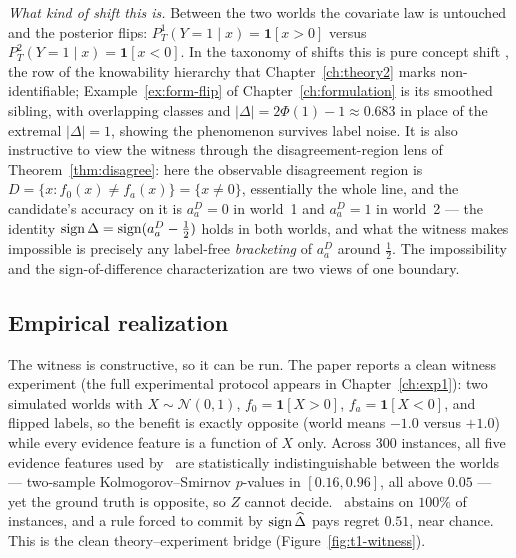 \emph{What kind of shift this is.} Between the two worlds the covariate law
is untouched and the posterior flips: $P_T^1(Y{=}1\mid x)=\mathbf1[x>0]$
versus $P_T^2(Y{=}1\mid x)=\mathbf1[x<0]$. In the taxonomy of shifts this
is pure concept shift \cite{quinonero2009dataset}, the row of the
knowability hierarchy that Chapter~\ref{ch:theory2} marks non-identifiable;
Example~\ref{ex:form-flip} of Chapter~\ref{ch:formulation} is its smoothed
sibling, with overlapping classes and $|\Delta|=2\Phi(1)-1\approx0.683$ in
place of the extremal $|\Delta|=1$, showing the phenomenon survives label
noise. It is also instructive to view the witness through the
disagreement-region lens of Theorem~\ref{thm:disagree}: here the observable
disagreement region is $D=\{x:f_0(x)\neq f_a(x)\}=\{x\neq0\}$, essentially
the whole line, and the candidate's accuracy on it is $a_a^D=0$ in world~1
and $a_a^D=1$ in world~2 --- the identity
$\operatorname{sign}\Delta=\operatorname{sign}(a_a^D-\tfrac12)$ holds in both worlds, and what the
witness makes impossible is precisely any label-free \emph{bracketing} of
$a_a^D$ around $\tfrac12$. The impossibility and the
sign-of-difference characterization are two views of one boundary.

\subsection{Empirical realization}\label{sec:t1-witness-empirical}

The witness is constructive, so it can be run. The paper reports a clean
witness experiment (the full experimental protocol appears in
Chapter~\ref{ch:exp1}): two simulated worlds with $X\sim\mathcal N(0,1)$,
$f_0=\mathbf1[X{>}0]$, $f_a=\mathbf1[X{<}0]$, and flipped labels, so the
benefit is exactly opposite (world means $-1.0$ versus $+1.0$) while every
evidence feature is a function of $X$ only. Across $300$ instances, all
five evidence features used by \KGA\ are statistically indistinguishable
between the worlds --- two-sample Kolmogorov--Smirnov $p$-values in
$[0.16,0.96]$, all above $0.05$ --- yet the ground truth is opposite, so
$Z$ cannot decide. \KGA\ abstains on $100\%$ of instances, and a rule
forced to commit by $\operatorname{sign}\widehat\Delta$ pays regret $0.51$, near chance.
This is the clean theory--experiment bridge
(Figure~\ref{fig:t1-witness}).

